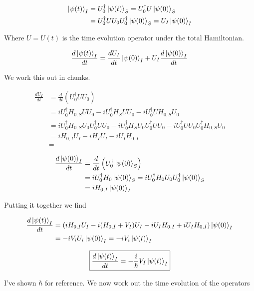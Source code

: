 \documentclass[12pt]{article}
\begin{document}
\begin{align}
\ket{\psi(t)}_I &= U_0^{\dag}\ket{\psi(t)}_S = U_0^{\dag}U\ket{\psi(0)}_S\\
&= U_0^{\dag} U U_0 U_0^{\dag} \ket{\psi(0)}_S = U_I \ket{\psi(0)}_I
\end{align}

Where $U=U(t)$ is the time evolution operator under the total Hamiltonian.

\begin{align}
\frac{d \ket{\psi(t)}_I}{d t} = \frac{d U_I}{d t} \ket{\psi(0)}_I + U_I \frac{d \ket{\psi(0)}_I}{d t}
\end{align}

We work this out in chunks.

\begin{align}
\frac{d{U_I}}{d t} &= \frac{d}{d t}(U_0^{\dag} U U_0)\\
&= iU_0^{\dag} H_{0,S} U U_0 - iU_0^{\dag} H_S U U_0 -iU_0^{\dag} U H_{0,S} U_0\\
&= iU_0^{\dag} H_{0,S} U_0 U_0^{\dag} U U_0 - iU_0^{\dag} H_SU_0 U_0^{\dag} U U_0 -iU_0^{\dag} U U_0 U_0^{\dag}H_{0,S} U_0\\
&= i H_{0,I} U_I - i H_I U_I - i U_I H_{0,I}\\
&= 
\end{align}

\begin{align}
\frac{d \ket{\psi(0)}_I}{d t} &= \frac{d}{d t} \left(U_0^{\dag} \ket{\psi(0)}_S\right)\\
&=i U_0^{\dag} H_0 \ket{\psi(0)}_S = i U_0^{\dag}H_0 U_0 U_0^{\dag} \ket{\psi(0)}_S\\
&= i H_{0,I} \ket{\psi(0)}_I
\end{align}

Putting it together we find

\begin{align}
\frac{d \ket{\psi(t)}_I}{d t} &= \left(i H_{0,I} U_I - i (H_{0,I} + V_I) U_I - i U_I H_{0,I} + i U_I H_{0,I} \right)\ket{\psi(0)}_I\\
&=-iV_iU_i\ket{\psi(0)}_I = -iV_i\ket{\psi(t)}_I
\end{align}

\begin{align}
\boxed{\frac{d \ket{\psi(t)}_I}{d t} = -\frac{i}{\hbar} V_I \ket{\psi(t)}_I}
\end{align}

I've shown $\hbar$ for reference.
We now work out the time evolution of the operators
\end{document}
